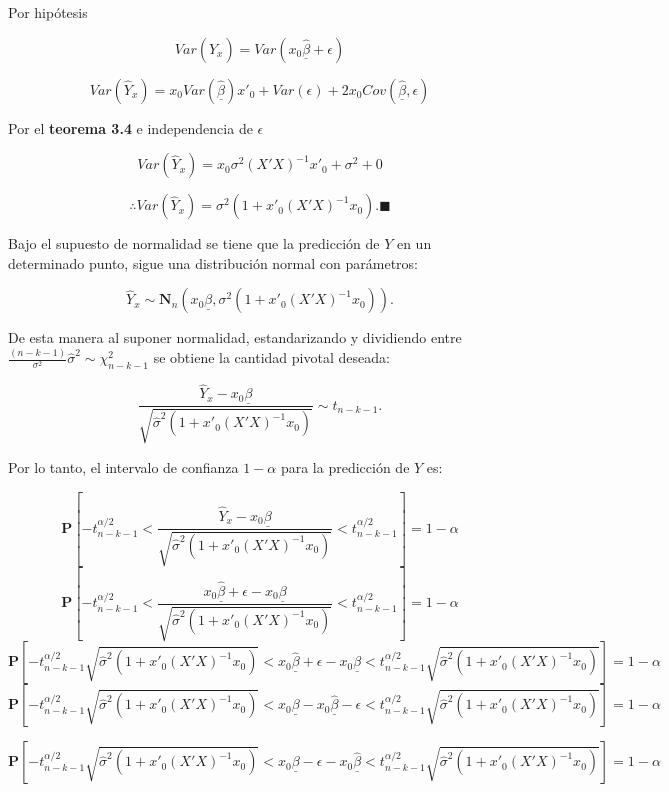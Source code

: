 \documentclass[a4paper,oneside,openany]{book}
\begin{document}
Por hipótesis

\[Var(\hat{Y}_{x})=Var(x_{0}\underline{\hat{\beta}}+\epsilon)\]

\[Var(\hat{Y}_{x})=x_{0}Var(\underline{\hat{\beta}})x'_{0}+Var(\epsilon)+2x_{0}Cov(\underline{\hat{\beta}},\epsilon)\]

Por el \textbf{teorema 3.4} e independencia de \(\epsilon\)

\[Var(\hat{Y}_{x})=x_{0}\sigma^2(X'X)^{-1}x'_{0}+\sigma^2+0\]

\[\therefore Var(\hat{Y}_{x})=\sigma^2\left(1+x'_{0}(X'X)^{-1}x_{0}\right). \blacksquare\]

Bajo el supuesto de normalidad se tiene que la predicción de \(Y\) en un
determinado punto, sigue una distribución normal con parámetros:

\[\hat{Y}_{x} \sim \mathbf{N}_{n} \left( x_{0}\underline{\beta}, \sigma^2\left(1+x'_{0}(X'X)^{-1}x_{0}\right)\right).\]

De esta manera al suponer normalidad, estandarizando y dividiendo entre
\(\frac{(n-k-1)}{\sigma^2}\hat{\sigma}^2 \sim \chi^2_{n-k-1}\) se
obtiene la cantidad pivotal deseada:

\[\frac{\hat{Y}_{x}-x_{0}\underline{\beta}}{\sqrt{\hat{\sigma}^2\left(1+x'_{0}(X'X)^{-1}x_{0}\right)}} \sim t_{n-k-1}.\]

Por lo tanto, el intervalo de confianza \(1-\alpha\) para la predicción
de \(Y\) es:

\[\mathbf{P}\left[-t^{\alpha/2}_{n-k-1}<\frac{\hat{Y}_{x}-x_{0}\underline{\beta}}{\sqrt{\hat{\sigma}^2\left(1+x'_{0}(X'X)^{-1}x_{0}\right)}}<t^{\alpha/2}_{n-k-1}\right]=1-\alpha\]
\[\mathbf{P}\left[-t^{\alpha/2}_{n-k-1}<\frac{x_{0}\underline{\hat{\beta}}+\epsilon-x_{0}\underline{\beta}}{\sqrt{\hat{\sigma}^2\left(1+x'_{0}(X'X)^{-1}x_{0}\right)}}<t^{\alpha/2}_{n-k-1}\right]=1-\alpha\]
\[\mathbf{P}\left[-t^{\alpha/2}_{n-k-1}\sqrt{\hat{\sigma}^2\left(1+x'_{0}(X'X)^{-1}x_{0}\right)}<x_{0}\underline{\hat{\beta}}+\epsilon-x_{0}\underline{\beta}<t^{\alpha/2}_{n-k-1}\sqrt{\hat{\sigma}^2\left(1+x'_{0}(X'X)^{-1}x_{0}\right)}\right]=1-\alpha\]
\[\mathbf{P}\left[-t^{\alpha/2}_{n-k-1}\sqrt{\hat{\sigma}^2\left(1+x'_{0}(X'X)^{-1}x_{0}\right)}<x_{0}\underline{\beta}-x_{0}\underline{\hat{\beta}}-\epsilon<t^{\alpha/2}_{n-k-1}\sqrt{\hat{\sigma}^2\left(1+x'_{0}(X'X)^{-1}x_{0}\right)}\right]=1-\alpha\]

\[\mathbf{P}\left[-t^{\alpha/2}_{n-k-1}\sqrt{\hat{\sigma}^2\left(1+x'_{0}(X'X)^{-1}x_{0}\right)}<x_{0}\underline{\beta}-\epsilon-x_{0}\underline{\hat{\beta}}<t^{\alpha/2}_{n-k-1}\sqrt{\hat{\sigma}^2\left(1+x'_{0}(X'X)^{-1}x_{0}\right)}\right]=1-\alpha\]
\end{document}

